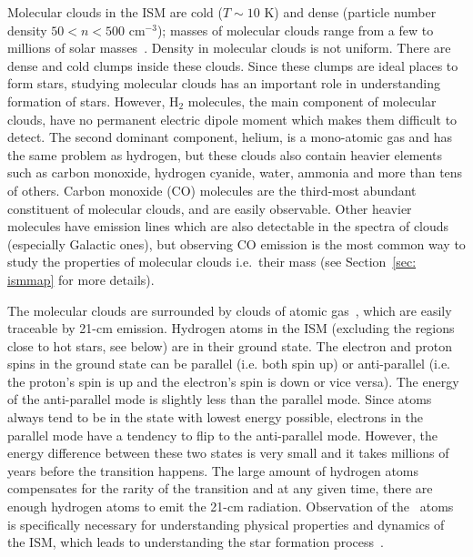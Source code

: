 Molecular clouds in the ISM are cold ($T \sim10$ K) and dense (particle number density $ 50<n<500$ cm$^{-3}$); masses of molecular clouds range from a few to millions of solar masses~\citep{Bolato08}.
Density in molecular clouds is not uniform. There are dense and cold clumps inside these clouds.
Since these clumps are ideal places to form stars, studying molecular clouds has an important role in understanding formation of stars.
However, H$_2$ molecules, the main component of molecular clouds, have no permanent electric dipole moment which makes them difficult to detect.
The second dominant component, helium, is a mono-atomic gas and has the same problem as hydrogen, but these clouds also contain heavier elements such as carbon monoxide, hydrogen cyanide, water, ammonia and more than tens of others.
Carbon monoxide (CO) molecules are the third-most abundant constituent of molecular clouds, and are easily observable.
Other heavier molecules have emission lines which are also detectable in the spectra of clouds (especially Galactic ones), but observing CO emission is the most common way to study the properties of molecular clouds i.e.\ their mass (see Section~\ref{sec: ismmap} for more details).

The molecular clouds are surrounded by clouds of atomic gas~\citep{Kennicutt12}, which are easily traceable by 21-cm emission.
Hydrogen atoms in the ISM (excluding the regions close to hot stars, see below) are in their ground state. 
The electron and proton spins in the ground state can be parallel (i.e. both spin up) or anti-parallel (i.e. the proton's spin is up and the electron's spin is down or vice versa). 
The energy of the anti-parallel mode is slightly less than the parallel mode.
Since atoms always tend to be in the state with lowest energy possible, electrons in the parallel mode have a tendency to flip to the anti-parallel mode. 
However, the energy difference between these two states is very small and it takes millions of years before the transition happens.
The large amount of hydrogen atoms compensates for the rarity of the transition and at any given time, there are enough hydrogen atoms to emit the 21-cm radiation. 
Observation of the \hi~atoms is specifically necessary for understanding physical properties and dynamics of the ISM, which leads to understanding the star formation process~\citep{Walter08}.

